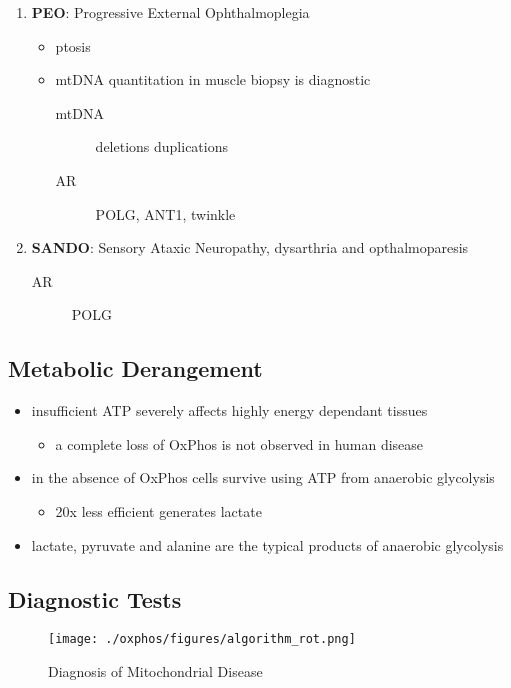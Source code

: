 \documentclass{scrartcl}
\begin{document}
\begin{enumerate}
\begin{enumerate}
\item \textbf{PEO}: Progressive External Ophthalmoplegia
\label{sec:org61879d0}
\begin{itemize}
\item ptosis
\item mtDNA quantitation in muscle biopsy is diagnostic
\begin{description}
\item[{mtDNA}] deletions \textpm{} duplications
\item[{AR}] POLG, ANT1, twinkle
\end{description}
\end{itemize}

\item \textbf{SANDO}: Sensory Ataxic Neuropathy, dysarthria and opthalmoparesis
\label{sec:org0303946}
\begin{description}
\item[{AR}] POLG
\end{description}
\end{enumerate}
\end{enumerate}

\subsection{Metabolic Derangement}
\label{sec:orgd59b30d}
\begin{itemize}
\item insufficient ATP severely affects highly energy dependant tissues
\begin{itemize}
\item a complete loss of OxPhos is not observed in human disease
\end{itemize}
\item in the absence of OxPhos cells survive using ATP from anaerobic glycolysis
\begin{itemize}
\item 20x less efficient generates lactate
\end{itemize}
\item lactate, pyruvate and alanine are the typical products of anaerobic glycolysis
\end{itemize}

\subsection{Diagnostic Tests}
\label{sec:org0e06e83}
\begin{figure}[htbp]
\centering
\texttt{[image: ./oxphos/figures/algorithm\_rot.png]}
\caption{\label{fig:orgf760a6c}
Diagnosis of Mitochondrial Disease}
\end{figure}
\end{document}
